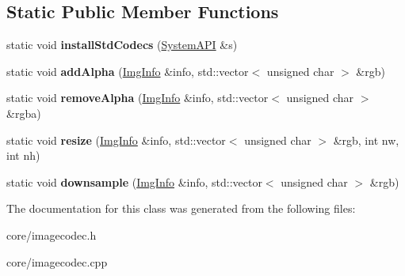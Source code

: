 \subsection*{Static Public Member Functions}
\begin{DoxyCompactItemize}
\item 
\hypertarget{class_tempest_1_1_image_codec_a057e58ed4f0d2b03593a2d319884a7ee}{static void {\bfseries install\+Std\+Codecs} (\hyperlink{class_tempest_1_1_system_a_p_i}{System\+A\+P\+I} \&s)}\label{class_tempest_1_1_image_codec_a057e58ed4f0d2b03593a2d319884a7ee}

\item 
\hypertarget{class_tempest_1_1_image_codec_ac3284f39ff91673c631118cdad7a9d2d}{static void {\bfseries add\+Alpha} (\hyperlink{struct_tempest_1_1_pixmap_1_1_img_info}{Img\+Info} \&info, std\+::vector$<$ unsigned char $>$ \&rgb)}\label{class_tempest_1_1_image_codec_ac3284f39ff91673c631118cdad7a9d2d}

\item 
\hypertarget{class_tempest_1_1_image_codec_abdcefe6087cb2c924641d9ee49a39cf5}{static void {\bfseries remove\+Alpha} (\hyperlink{struct_tempest_1_1_pixmap_1_1_img_info}{Img\+Info} \&info, std\+::vector$<$ unsigned char $>$ \&rgba)}\label{class_tempest_1_1_image_codec_abdcefe6087cb2c924641d9ee49a39cf5}

\item 
\hypertarget{class_tempest_1_1_image_codec_a7f6fe78948c973521a5344acc9b1cc0e}{static void {\bfseries resize} (\hyperlink{struct_tempest_1_1_pixmap_1_1_img_info}{Img\+Info} \&info, std\+::vector$<$ unsigned char $>$ \&rgb, int nw, int nh)}\label{class_tempest_1_1_image_codec_a7f6fe78948c973521a5344acc9b1cc0e}

\item 
\hypertarget{class_tempest_1_1_image_codec_aa655d054444380a8af3e909b47213332}{static void {\bfseries downsample} (\hyperlink{struct_tempest_1_1_pixmap_1_1_img_info}{Img\+Info} \&info, std\+::vector$<$ unsigned char $>$ \&rgb)}\label{class_tempest_1_1_image_codec_aa655d054444380a8af3e909b47213332}

\end{DoxyCompactItemize}


The documentation for this class was generated from the following files\+:\begin{DoxyCompactItemize}
\item 
core/imagecodec.\+h\item 
core/imagecodec.\+cpp\end{DoxyCompactItemize}
